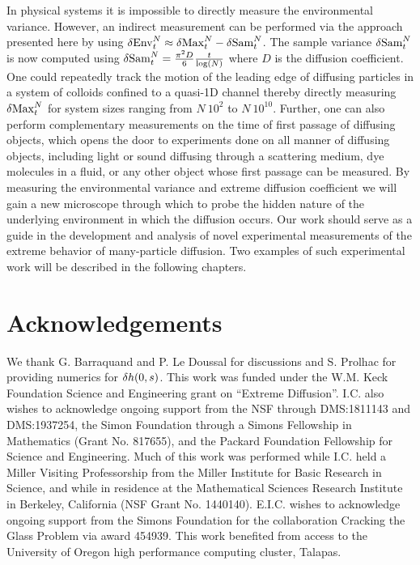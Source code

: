 In physical systems it is impossible to directly measure the environmental variance. However, an indirect measurement can be performed via the approach presented here by using $\var \mathrm{Env}^{N}_t\approx \var \mathrm{Max}^{N}_t - \var \mathrm{Sam}^{N}_t$. The sample variance $\var \mathrm{Sam}^{N}_t$ is now computed using
$
 \var \mathrm{Sam}^{N}_t = \frac{\pi^2 D}{6} \frac{t}{\log(N)}
$
where $D$ is the diffusion coefficient. One could repeatedly track the motion of the leading edge of diffusing particles in a system of colloids confined to a quasi-1D channel thereby directly measuring $\var \mathrm{Max}^{N}_t$ for system sizes ranging from $N ~ 10^2$ to $N ~ 10^{10}$. Further, one can also perform complementary measurements on the time of first passage of diffusing objects, which opens the door to experiments done on all manner of diffusing objects, including light or sound diffusing through a scattering medium, dye molecules in a fluid, or any other object whose first passage can be measured.
By measuring the environmental variance and extreme diffusion coefficient we will gain a new microscope through which to probe the hidden nature of the underlying environment in which the diffusion occurs. Our work should serve as a guide in the development and analysis of novel experimental measurements of the extreme behavior of many-particle diffusion. Two examples of such experimental work will be described in the following chapters.

\section{Acknowledgements}
We thank G. Barraquand and P. Le Doussal for discussions and S. Prolhac for providing numerics for $\var{h(0,s)}$.
This work was funded under the W.M. Keck Foundation Science and Engineering grant on ``Extreme Diffusion''.
I.C. also wishes to acknowledge ongoing support from the NSF through DMS:1811143 and DMS:1937254, the Simon Foundation through a Simons Fellowship in Mathematics (Grant No. 817655), and the Packard Foundation Fellowship for Science and Engineering. Much of this work was performed while I.C. held a Miller Visiting Professorship from the Miller Institute for Basic Research in Science, and while in residence at the Mathematical Sciences Research Institute in Berkeley, California (NSF Grant No. 1440140).
E.I.C. wishes to acknowledge ongoing support from the Simons Foundation for the collaboration Cracking the Glass Problem via award 454939. This work benefited from access to the University of Oregon high performance computing cluster, Talapas.

